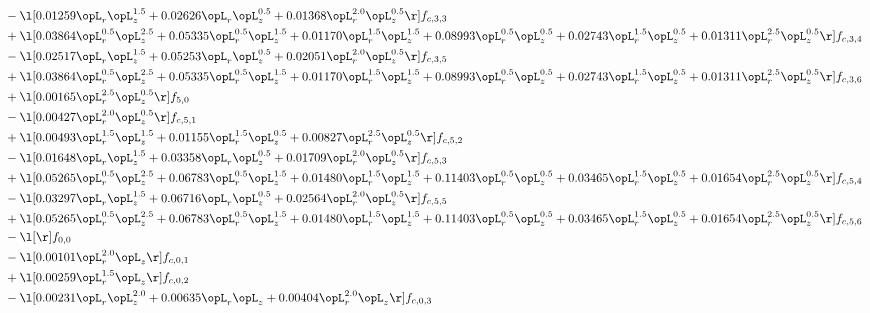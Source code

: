 \begin{alignat}{2}
& - \l[  0.01259 \opL_r \opL_z^{1.5} +  0.02626 \opL_r \opL_z^{0.5} +  0.01368 \opL_r^{2.0} \opL_z^{0.5}  \r] f_{c,3,3} \nonumber \\ 
& + \l[  0.03864 \opL_r^{0.5} \opL_z^{2.5} +  0.05335 \opL_r^{0.5} \opL_z^{1.5} +  0.01170 \opL_r^{1.5} \opL_z^{1.5} +  0.08993 \opL_r^{0.5} \opL_z^{0.5} +  0.02743 \opL_r^{1.5} \opL_z^{0.5} +  0.01311 \opL_r^{2.5} \opL_z^{0.5}  \r] f_{c,3,4} \nonumber \\ 
& - \l[  0.02517 \opL_r \opL_z^{1.5} +  0.05253 \opL_r \opL_z^{0.5} +  0.02051 \opL_r^{2.0} \opL_z^{0.5}  \r] f_{c,3,5} \nonumber \\ 
& + \l[  0.03864 \opL_r^{0.5} \opL_z^{2.5} +  0.05335 \opL_r^{0.5} \opL_z^{1.5} +  0.01170 \opL_r^{1.5} \opL_z^{1.5} +  0.08993 \opL_r^{0.5} \opL_z^{0.5} +  0.02743 \opL_r^{1.5} \opL_z^{0.5} +  0.01311 \opL_r^{2.5} \opL_z^{0.5}  \r] f_{c,3,6} \nonumber \\ 
& + \l[  0.00165 \opL_r^{2.5} \opL_z^{0.5}  \r] f_{5,0} \nonumber \\ 
& - \l[  0.00427 \opL_r^{2.0} \opL_z^{0.5}  \r] f_{c,5,1} \nonumber \\ 
& + \l[  0.00493 \opL_r^{1.5} \opL_z^{1.5} +  0.01155 \opL_r^{1.5} \opL_z^{0.5} +  0.00827 \opL_r^{2.5} \opL_z^{0.5}  \r] f_{c,5,2} \nonumber \\ 
& - \l[  0.01648 \opL_r \opL_z^{1.5} +  0.03358 \opL_r \opL_z^{0.5} +  0.01709 \opL_r^{2.0} \opL_z^{0.5}  \r] f_{c,5,3} \nonumber \\ 
& + \l[  0.05265 \opL_r^{0.5} \opL_z^{2.5} +  0.06783 \opL_r^{0.5} \opL_z^{1.5} +  0.01480 \opL_r^{1.5} \opL_z^{1.5} +  0.11403 \opL_r^{0.5} \opL_z^{0.5} +  0.03465 \opL_r^{1.5} \opL_z^{0.5} +  0.01654 \opL_r^{2.5} \opL_z^{0.5}  \r] f_{c,5,4} \nonumber \\ 
& - \l[  0.03297 \opL_r \opL_z^{1.5} +  0.06716 \opL_r \opL_z^{0.5} +  0.02564 \opL_r^{2.0} \opL_z^{0.5}  \r] f_{c,5,5} \nonumber \\ 
& + \l[  0.05265 \opL_r^{0.5} \opL_z^{2.5} +  0.06783 \opL_r^{0.5} \opL_z^{1.5} +  0.01480 \opL_r^{1.5} \opL_z^{1.5} +  0.11403 \opL_r^{0.5} \opL_z^{0.5} +  0.03465 \opL_r^{1.5} \opL_z^{0.5} +  0.01654 \opL_r^{2.5} \opL_z^{0.5}  \r] f_{c,5,6} \nonumber \\ 
& - \l[  \r] f_{0,0} \nonumber \\ 
& - \l[  0.00101 \opL_r^{2.0} \opL_z  \r] f_{c,0,1} \nonumber \\ 
& + \l[  0.00259 \opL_r^{1.5} \opL_z  \r] f_{c,0,2} \nonumber \\ 
& - \l[  0.00231 \opL_r \opL_z^{2.0} +  0.00635 \opL_r \opL_z +  0.00404 \opL_r^{2.0} \opL_z  \r] f_{c,0,3} \nonumber \\ 

\end{alignat}
